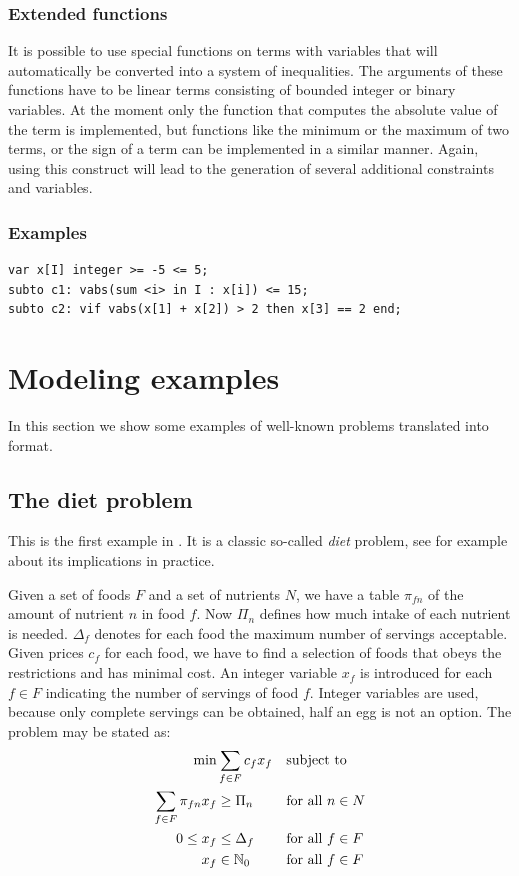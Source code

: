 \subsubsection{Extended functions}
It is possible to use special functions on terms with variables that
will automatically be converted into a system of inequalities. The
arguments of these functions have to be linear terms consisting of
bounded integer or binary variables. At the moment only the function
 that computes the absolute value of the term 
is implemented, but functions like the minimum or the maximum of two
terms, or the sign of a term can be implemented in a similar manner.
Again, using this construct will lead to
the generation of several additional constraints and variables.

\subsubsection{Examples}
{\small
\begin{verbatim}
var x[I] integer >= -5 <= 5;
subto c1: vabs(sum <i> in I : x[i]) <= 15;
subto c2: vif vabs(x[1] + x[2]) > 2 then x[3] == 2 end;
\end{verbatim}
}




\clearpage
\section{Modeling examples}\label{modelingexamples}
In this section we show some examples of well-known problems
translated into \zimpl format.

\subsection{The diet problem}
This is the first example in
\cite[Chapter 1, page 3]{Chvatal1983}.
It is a classic so-called \emph{diet} problem, see for example
\cite{Dantzig1990} about its implications in practice.

Given a set of foods $F$ and a set of nutrients $N$, we have a table
$\pi_{fn}$ of the amount of nutrient $n$ in food $f$. Now $\Pi_n$
defines how much intake of each nutrient is needed. $\Delta_f$
denotes for each food the maximum number of servings acceptable.
Given prices $c_f$ for each food, we have to find a selection of foods
that obeys the restrictions and has minimal cost. An integer
variable $x_f$ is introduced for each $f\in F$ indicating the number of servings of
food $f$. Integer variables are used, because only complete servings can be
obtained, \ie half an egg is not an option.
The problem may be stated as:
\begin{align*}
\min&\sum_{f\in F}c_{f} x_{f}&&\mbox{subject to}\nonumber\\
\sum_{f\in F} \pi_{fn} x_{f}&\ge\Pi_n&&\text{for all } n\in N\nonumber\\
0\leq x_{f}&\leq\Delta_f&&\text{for all } f\in F\nonumber\\
x_{f}&\in\mathbb{N}_0&&\text{for all } f\in F
\end{align*}


